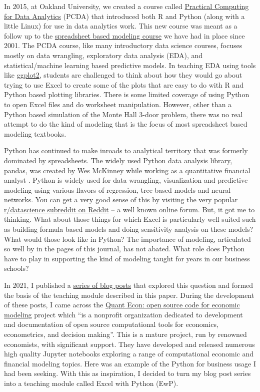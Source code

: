 \documentclass[ited]{informs3}                      %
\begin{document}
In 2015, at Oakland University, we created a course called \href{http://www.sba.oakland.edu/faculty/isken/courses/pcda/}{Practical Computing for Data Analytics} (PCDA) that introduced both R and Python (along with a little Linux) for use in data analytics work. This new course was meant as a follow up to the \href{http://www.sba.oakland.edu/faculty/isken/courses/ba/}{spreadsheet based modeling course} we have had in place since 2001. The PCDA course, like many introductory data science courses, focuses mostly on data wrangling, exploratory data analysis (EDA), and statistical/machine learning based predictive models. In teaching EDA using tools like \href{https://ggplot2.tidyverse.org/}{ggplot2}, students are challenged to think about how they would go about trying to use Excel to create some of the plots that are easy to do with R and Python based plotting libraries. There is some limited coverage of using Python to open Excel files and do worksheet manipulation. However, other than a Python based simulation of the Monte Hall 3-door problem, there was no real attempt to do the kind of modeling that is the focus of most spreadsheet based modeling textbooks. 

Python has continued to make inroads to analytical territory that was formerly dominated by spreadsheets. The widely used Python data analysis library, pandas, was created by Wes McKinney while working as a quantitative financial analyst \citep{mckinney2022python}. Python is widely used for data wrangling, visualization and predictive modeling using various flavors of regression, tree based models and neural networks. You can get a very good sense of this by visiting the very popular \href{https://www.reddit.com/r/datascience/}{r/datascience subreddit on Reddit} -- a well known online forum. But, it got me to thinking. What about those things for which Excel is particularly well suited such as building formula based models and doing sensitivity analysis on these models? What would those look like in Python? The importance of modeling, articulated so well by \citet{powellTeachingModelingManagement2001} in the pages of this journal, has not abated. What role does Python have to play in supporting the kind of modeling taught for years in our business schools?

In 2021, I published a \href{https://bitsofanalytics.org/#category=excel}{series of blog posts} that explored this question and formed the basis of the teaching module described in this paper. During the development of these posts, I came across the \href{https://quantecon.org/}{Quant Econ: open source code for economic modeling} project which ``is a nonprofit organization dedicated to development and documentation of open source computational tools for economics, econometrics, and decision making''. This is a mature project, run by renowned economists, with significant support. They have developed and released numerous high quality Jupyter notebooks exploring a range of computational economic and financial modeling topics. Here was an example of the Python for business usage I had been seeking. With this as inspiration, I decided to turn my blog post series into a teaching module called Excel with Python (EwP). 
\end{document}
